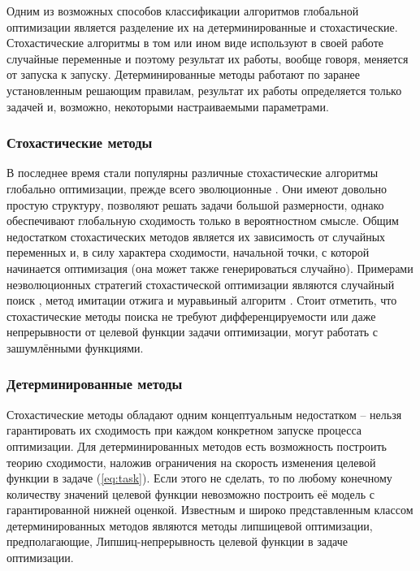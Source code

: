 Одним из возможных способов классификации алгоритмов глобальной оптимизации является разделение их
на детерминированные и стохастические. Стохастические алгоритмы в том или ином виде используют в своей работе
случайные переменные и поэтому результат их работы, вообще говоря, меняется от запуска к запуску. Детерминированные методы
работают по заранее установленным решающим правилам, результат их работы определяется только задачей и,
возможно, некоторыми настраиваемыми параметрами.

\subsubsection{Стохастические методы}

В последнее время стали популярны различные стохастические алгоритмы глобально оптимизации,
прежде всего эволюционные \cite{Storn1997, SCHLUTER2009, KennedyEberhart1995}. 
Они имеют довольно простую структуру, позволяют решать задачи большой размерности,
однако обеспечивают глобальную сходимость только в вероятностном смысле. Общим недостатком
стохастических методов является их зависимость от случайных переменных и, в силу характера сходимости,
начальной точки, с которой начинается оптимизация (она может также генерироваться случайно).
Примерами неэволюционных стратегий стохастической оптимизации являются случайный поиск \cite{rastrigin1963},
метод имитации отжига \cite{XIANG1997216} и муравьиный алгоритм \cite{ZhangACO2008}. Стоит отметить, что
стохастические методы поиска не требуют дифференцируемости или даже непрерывности от целевой функции задачи оптимизации,
могут работать с зашумлёнными функциями.

\subsubsection{Детерминированные методы}

Стохастические методы обладают одним концептуальным недостатком -- нельзя гарантировать их сходимость при 
каждом конкретном запуске процесса оптимизации. Для детерминированных методов есть возможность построить теорию сходимости,
наложив ограничения на скорость изменения целевой функции в задаче (\ref{eq:task}). Если этого не сделать, то
по любому конечному количеству значений целевой функции невозможно построить её модель с гарантированной нижней оценкой.
Известным и широко представленным классом детерминированных методов являются методы липшицевой оптимизации, предполагающие,
Липшиц-непрерывность целевой функции в задаче оптимизации. 


